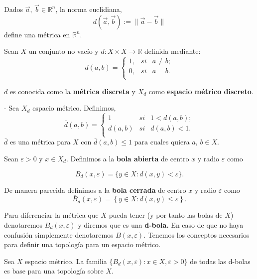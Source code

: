 \begin{ej}
 Dados $\vec{a}$, $\vec{b} \in \mathbb{R}^{n}$, la norma euclidiana,
$$d(\vec{a},\vec{b}):=\parallel \vec{a}-\vec{b} \parallel$$
define una métrica en $\mathbb{R}^{n}$.
\end{ej}

\begin{ej}
 Sean $X$ un conjunto no vacío y $d : X \times X \to\mathbb{R}$ definida mediante:
$$d(a,b)=\left\{
\begin{array}{lcc}
1, & si & a \neq b; \\
0, & si & a=b. \\
\end{array}
\right.$$

$d$ es conocida como la \textbf{métrica discreta} y  $X_{d}$ como \textbf{espacio métrico discreto}.
\end{ej}

\begin{ej}\label{ejem:metrica-acotada}
- Sea $X_{d}$ espacio métrico. Definimos,
$$\bar{d}(a,b)=\left\{
\begin{array}{lcc}
1 & si & 1 < d(a,b);   \\
d(a,b) & si & d(a,b)<1. \\
\end{array}
\right.
$$
$\bar{d}$ es una métrica para $X$ con $\bar{d}(a,b)\leq 1$ para cuales quiera $a$, $b \in X.$ 
\end{ej}

\label{def:top-espacios-metricos}
\begin{df}
Sean $\varepsilon > 0$ y $x\in X_d$. Definimos a la \textbf{bola abierta} de centro $x$ y radio $\varepsilon$  como

$$B_{d}(x,\varepsilon)=\{ y \in X: d(x,y)< \varepsilon \}.$$

De manera parecida definimos a la \textbf{bola cerrada} de centro $x$ y radio $\varepsilon$  como
$$\overline{B}_{d}(x,\varepsilon)=\left\lbrace y \in X: d(x,y)\leq \varepsilon \right\rbrace.$$
\end{df}

Para diferenciar la métrica que $X$ pueda tener (y por tanto las bolas de $X$) denotaremos $B_{d}(x,\varepsilon)$ y diremos que es una \textbf{d-bola.} En caso de que no haya confusión simplemente denotaremos $B(x,\varepsilon)$. Tenemos los conceptos necesarios para definir una topología para un espacio métrico.

\begin{pr}\label{prp:bolas-bse}
Sea $X$ espacio métrico. La familia $\lbrace B_{d}(x,\varepsilon): x \in X, \varepsilon > 0\rbrace$ de todas las d-bolas es base para una topología sobre $X$.
\end{pr}


